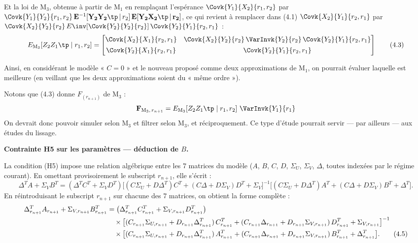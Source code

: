 \documentclass[12pt, a4paper]{article}
\newcommand{\EMj}[2]{E_{\mathrm{M}_{#1}}\!\left[#2\right]}
\begin{document}
{Et la loi de $\mathrm{M}_3$, obtenue à partir de $\mathrm{M}_1$ en remplaçant l'espérance
$\Covk{Y_1}{X_2}{r_1, r_2}$ par
$\Covk{Y_1}{Y_2}{r_1, r_2}\,\mathbf{E}^{-1}[\mathbf{Y_2 Y_2\tp}\,|\,r_2]\,\mathbf{E}[\mathbf{Y_2 X_2\tp}\,|\,\mathbf{r_2}]$,
ce qui revient à remplacer dans (4.1) $\Covk{X_2}{Y_1}{r_2, r_1}$ par
$\Covk{X_2}{Y_2}{r_2}\,E\inv[\Covk{Y_2}{Y_2}{r_2}]\,\Covk{Y_2}{Y_1}{r_2, r_1}$ :
\begin{equation}
  \EMj{3}{Z_2 Z_1\tp \mid r_1, r_2}
  = \begin{bmatrix}
      \Covk{X_2}{X_1}{r_2, r_1}
        & \Covk{X_2}{Y_2}{r_2}\,\VarInvk{Y_2}{r_2}\,\Covk{Y_2}{Y_1}{r_2, r_1} \\[4pt]
      \Covk{Y_2}{X_1}{r_2, r_1} & \Covk{Y_2}{Y_1}{r_2, r_1}
    \end{bmatrix}
  \tag{4.3}
\end{equation}

Ainsi, en considérant le modèle « $C=0$ » et le nouveau proposé comme deux approximations
de $\mathrm{M}_1$, on pourrait évaluer laquelle est meilleure (en veillant que les deux
approximations soient du « même ordre »).

Notons que (4.3) donne $F_{(r_{n+1})}$ de $\mathrm{M}_3$ :
\begin{equation*}
  \mathbf{F}_{\mathrm{M}_3,\, r_{n+1}}
  = \EMj{3}{Z_2 Z_1\tp \mid r_1, r_2}\,\VarInvk{Y_1}{r_1}
\end{equation*}
On devrait donc pouvoir simuler selon $\mathrm{M}_3$ et filtrer selon $\mathrm{M}_3$, et
réciproquement. Ce type d'étude pourrait servir --- par ailleurs --- aux études du lissage.

\bigskip
\noindent\textbf{Contrainte H5 sur les paramètres — déduction de $B$.}

\smallskip
La condition (H5) impose une relation algébrique entre les 7 matrices du modèle
($A$, $B$, $C$, $D$, $\Sigma_U$, $\Sigma_V$, $\Delta$, toutes indexées par le régime courant).
En omettant provisoirement le subscript $r_{n+1}$, elle s'écrit :
\begin{equation}
  \Delta^T A + \Sigma_V B^T
  = (\Delta^T C^T + \Sigma_V D^T)
    \bigl[(C\Sigma_U + D\Delta^T)C^T + (C\Delta + D\Sigma_V)D^T + \Sigma_V\bigr]^{-1}
    \bigl[(C\Sigma_U + D\Delta^T)A^T + (C\Delta + D\Sigma_V)B^T + \Delta^T\bigr].
  \tag{4.4}
\end{equation}
En réintroduisant le subscript $r_{n+1}$ sur chacune des 7 matrices, on obtient la forme
complète :
\begin{align}
  \Delta_{r_{n+1}}^T A_{r_{n+1}} + \Sigma_{V,r_{n+1}} B_{r_{n+1}}^T
  &= \bigl(\Delta_{r_{n+1}}^T C_{r_{n+1}}^T + \Sigma_{V,r_{n+1}} D_{r_{n+1}}^T\bigr)
  \notag\\
  &\quad\times
    \bigl[
      (C_{r_{n+1}}\Sigma_{U,r_{n+1}} + D_{r_{n+1}}\Delta_{r_{n+1}}^T)\,C_{r_{n+1}}^T
     +(C_{r_{n+1}}\Delta_{r_{n+1}} + D_{r_{n+1}}\Sigma_{V,r_{n+1}})\,D_{r_{n+1}}^T
     + \Sigma_{V,r_{n+1}}
    \bigr]^{-1}
  \notag\\
  &\quad\times
    \bigl[
      (C_{r_{n+1}}\Sigma_{U,r_{n+1}} + D_{r_{n+1}}\Delta_{r_{n+1}}^T)\,A_{r_{n+1}}^T
     +(C_{r_{n+1}}\Delta_{r_{n+1}} + D_{r_{n+1}}\Sigma_{V,r_{n+1}})\,B_{r_{n+1}}^T
     + \Delta_{r_{n+1}}^T
    \bigr].
  \tag{4.5}
\end{align}

}
\end{document}
